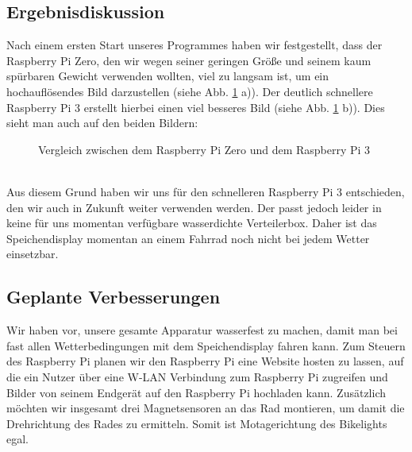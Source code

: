 \documentclass [a4paper, 11pt] {article}
\begin{document}
\subsection{Ergebnisdiskussion}
Nach einem ersten Start unseres Programmes haben wir festgestellt, dass der Raspberry Pi Zero, den wir wegen seiner geringen Größe und seinem kaum spürbaren Gewicht verwenden wollten, viel zu langsam ist, um ein hochauflösendes Bild darzustellen (siehe Abb. \ref{Vergleich} a)). Der deutlich schnellere Raspberry Pi 3 erstellt hierbei einen viel besseres Bild (siehe Abb. \ref{Vergleich} b)). Dies sieht man auch auf den beiden Bildern:
\begin{figure}[h]
\centering
{} 
\caption{Vergleich zwischen dem Raspberry Pi Zero und dem Raspberry Pi 3}
\label{Vergleich}
\end{figure}
\\Aus diesem Grund haben wir uns für den schnelleren Raspberry Pi 3 entschieden, den wir auch in Zukunft weiter verwenden werden. Der passt jedoch leider in keine für uns momentan verfügbare wasserdichte Verteilerbox. Daher ist das Speichendisplay momentan an einem Fahrrad noch nicht bei jedem Wetter einsetzbar.
\subsection{Geplante Verbesserungen}
Wir haben vor, unsere gesamte Apparatur wasserfest zu machen, damit man bei fast allen Wetterbedingungen mit dem Speichendisplay fahren kann. Zum Steuern des Raspberry Pi planen wir den Raspberry Pi eine Website hosten zu lassen, auf die ein Nutzer über eine W-LAN Verbindung zum Raspberry Pi zugreifen und Bilder von seinem Endgerät auf den Raspberry Pi hochladen kann. Zusätzlich möchten wir insgesamt drei Magnetsensoren an das Rad montieren, um damit die Drehrichtung des Rades zu ermitteln. Somit ist Motagerichtung des Bikelights egal. 
\end{document}
